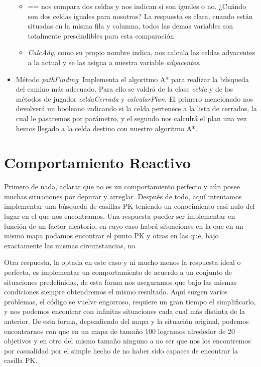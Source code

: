 \documentclass[12pt]{article}
\begin{document}
\begin{itemize}
\begin{itemize}
\item == nos compara dos celdas y nos indican si son iguales o no. ¿Cuándo son dos celdas iguales para nosotros? La respuesta es clara, cuando están situadas en la misma fila y columna, todos las demas variables son totalmente prescindibles para esta comparación.

\item \emph{CalcAdy}, como su propio nombre indica, nos calcula las celdas adyacentes a la actual y se las asigna a nuestra variable \emph{adyacentes}.
\end{itemize}

\newpage

\item Método \emph{pathFinding}: Implementa el algoritmo A* para realizar la búsqueda del camino más adecuado. Para ello se valdrá de la clase \emph{celda} y de los métodos de jugador \emph{celdaCerrada} y \emph{calcularPlan}. El primero mencionado nos devolverá un booleano indicando si la celda pertenece a la lista de cerrados, la cual le pasaremos por parámetro, y el segundo nos calculrá el plan una vez hemos llegado a la celda destino con nuestro algoritmo A*.
\end{itemize}

\section{Comportamiento Reactivo}
Primero de nada, aclarar que no es un comportamiento perfecto y aún posee muchas situaciones por depurar y arreglar. Después de todo, aquí intentamos implementar una búsqueda de casillas PK teniendo un conocimiento casi nulo del lugar en el que nos encontramos. Una respuesta pueder ser implementar en función de un factor aleatorio, en cuyo caso habrá situaciones en la que en un mismo mapa podamos encontrar el punto PK y otras en las que, bajo exactamente las mismas circunstancias, no. 

Otra respuesta, la optada en este caso y ni mucho menos la respuesta ideal o perfecta, es implementar un comportamiento de acuerdo a un conjunto de situaciones predefinidas, de esta forma nos aseguramos que bajo las mismas condiciones siempre obtendremos el mismo resultado. Aquí surgen varios problemas, el código se vuelve engorroso, requiere un gran tiempo el simplificarlo, y nos podemos encontrar con infinitas situaciones cada cual más distinta de la anterior. De esta forma, dependiendo del mapa y la situación original, podemos encontrarnos con que en un mapa de tamaño 100 logramos alrededor de 20 objetivos y en otro del mismo tamaño ninguno a no ser que nos los encontremos por casualidad por el simple hecho de no haber sido capaces de encontrar la casilla PK.
\end{document}
